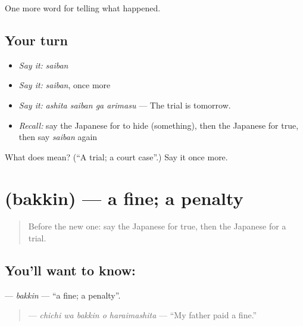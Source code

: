 \begin{grammarlens}[title={What you've built}]
One more word for telling what happened.
\end{grammarlens}

\subsection*{Your turn}
\begin{itemize}
\raggedright
  \item \emph{Say it:} \emph{saiban}
  \item \emph{Say it:} \emph{saiban}, once more
  \item \emph{Say it:} \emph{ashita saiban ga arimasu} — The trial is tomorrow.
  \item \emph{Recall:} say the Japanese for to hide (something), then the Japanese for true, then say \emph{saiban} again
\end{itemize}

\begin{tcolorbox}[breakable,colback=teal!4,colframe=teal!35!black,title={Before you move on}]
What does  mean? (\textquotedblleft{}A trial; a court case\textquotedblright{}.) Say it once more.
\end{tcolorbox}
\section[\texorpdfstring{\ja{ばっきん} (bakkin)}{ばっきん (bakkin)}]{ (bakkin) — a fine; a penalty}

\label{lesson:JA-C273-bakkin}



\begin{quote}
Before the new one: say the Japanese for true, then the Japanese for a trial.
\end{quote}

\subsection*{You'll want to know: }
\textbf{} — \emph{bakkin} — \textquotedblleft{}a fine; a penalty\textquotedblright{}.

\begin{quote}
\textbf{  } — \emph{chichi wa bakkin o haraimashita} — \textquotedblleft{}My father paid a fine.\textquotedblright{}
\end{quote}

